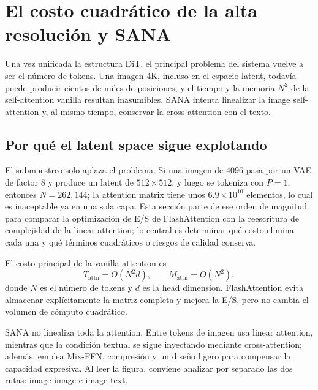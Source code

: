 \section{El costo cuadrático de la alta resolución y SANA}

Una vez unificada la estructura DiT, el principal problema del sistema vuelve a ser el número de tokens. Una imagen 4K, incluso en el espacio latent, todavía puede producir cientos de miles de posiciones, y el tiempo y la memoria $N^2$ de la self-attention vanilla resultan inasumibles. SANA intenta linealizar la image self-attention y, al mismo tiempo, conservar la cross-attention con el texto.

\subsection{Por qué el latent space sigue explotando}

El submuestreo solo aplaza el problema. Si una imagen de 4096 pasa por un VAE de factor 8 y produce un latent de $512\times512$, y luego se tokeniza con $P=1$, entonces $N=262{,}144$; la attention matrix tiene unos $6.9\times10^{10}$ elementos, lo cual es inaceptable ya en una sola capa. Esta sección parte de ese orden de magnitud para comparar la optimización de E/S de FlashAttention con la reescritura de complejidad de la linear attention; lo central es determinar qué costo elimina cada una y qué términos cuadráticos o riesgos de calidad conserva.


El costo principal de la vanilla attention es
\[
T_{\mathrm{attn}}=O(N^2d),\qquad
M_{\mathrm{attn}}=O(N^2),
\]
donde $N$ es el número de tokens y $d$ es la head dimension. FlashAttention evita almacenar explícitamente la matriz completa y mejora la E/S, pero no cambia el volumen de cómputo cuadrático.


SANA no linealiza toda la attention. Entre tokens de imagen usa linear attention, mientras que la condición textual se sigue inyectando mediante cross-attention; además, emplea Mix-FFN, compresión y un diseño ligero para compensar la capacidad expresiva. Al leer la figura, conviene analizar por separado las dos rutas: image-image e image-text.

